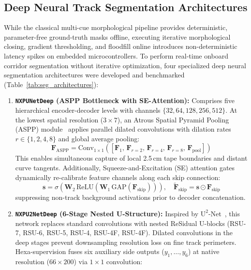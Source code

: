 \documentclass[10pt,journal,compsoc]{IEEEtran}
\begin{document}
\subsection{Deep Neural Track Segmentation Architectures}
\label{sec:unet_segmenters}
While the classical multi-cue morphological pipeline provides deterministic, parameter-free ground-truth masks offline, executing iterative morphological closing, gradient thresholding, and floodfill online introduces non-deterministic latency spikes on embedded microcontrollers. To perform real-time onboard corridor segmentation without iterative optimization, four specialized deep neural segmentation architectures were developed and benchmarked (Table~\ref{tab:seg_architectures}):
\begin{enumerate}
    \item \textbf{\texttt{NXPUNetDeep} (ASPP Bottleneck with SE-Attention):} Comprises five hierarchical encoder-decoder levels with channels $\{32, 64, 128, 256, 512\}$. At the lowest spatial resolution ($3 \times 7$), an Atrous Spatial Pyramid Pooling (ASPP) module~\cite{chen2017rethinking} applies parallel dilated convolutions with dilation rates $r \in \{1, 2, 4, 8\}$ and global average pooling:
    \begin{equation}
    \mathbf{F}_{\text{ASPP}} = \text{Conv}_{1 \times 1}\left(\left[\mathbf{F}_1, \, \mathbf{F}_{r=2}, \, \mathbf{F}_{r=4}, \, \mathbf{F}_{r=8}, \, \mathbf{F}_{\text{pool}}\right]\right)
    \end{equation}
    This enables simultaneous capture of local 2.5\,cm tape boundaries and distant curve tangents. Additionally, Squeeze-and-Excitation (SE) attention gates~\cite{hu2018squeeze} dynamically re-calibrate feature channels along each skip connection:
    \begin{equation}
    \mathbf{s} = \sigma\left(\mathbf{W}_2 \, \text{ReLU}\left(\mathbf{W}_1 \, \text{GAP}(\mathbf{F}_{\text{skip}})\right)\right), \quad \widetilde{\mathbf{F}}_{\text{skip}} = \mathbf{s} \odot \mathbf{F}_{\text{skip}}
    \end{equation}
    suppressing non-track background activations prior to decoder concatenation.
    \item \textbf{\texttt{NXPU2NetDeep} (6-Stage Nested U-Structure):} Inspired by $\text{U}^2$-Net~\cite{qin2020u2}, this network replaces standard convolutions with nested ReSidual U-blocks (RSU-7, RSU-6, RSU-5, RSU-4, RSU-4F, RSU-4F). Dilated convolutions in the deep stages prevent downsampling resolution loss on fine track perimeters. Hexa-supervision fuses six auxiliary side outputs ($y_1, \dots, y_6$) at native resolution ($66 \times 200$) via $1 \times 1$ convolution:

\end{enumerate}
\end{document}
